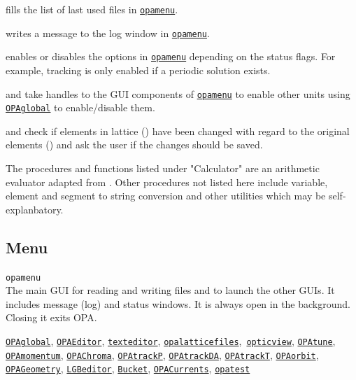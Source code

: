 \documentclass[12pt]{article}
\newcommand\code[1]{{\tt #1}}
\newcommand{\unico}[1]{{\color{burntorange}\code{#1}}}
\newcommand{\opagui}[1]{\colorbox{blue!20}{\code{#1}}}
\newcommand{\oguih}[2]{\subsection{\label{#2}#1}{\Huge\opagui{#2}}\\}
\newcommand{\ogui}[1]{\hyperref[#1]{\opagui{#1}}}
\newcommand{\opauni}[1]{\colorbox{orange!30}{\code{#1}}}
\newcommand{\ouni}[1]{\hyperref[#1]{\opauni{#1}}}
\newcommand{\uses}[1]{\flushleft {\bf Uses:} #1}
\newcommand{\desc}[1]{#1}
\begin{document}
{\unico{FillComboSeg} fills the list of last used files in \ogui{opamenu}.

\unico{OPALog} writes a message to the log window in \ogui{opamenu}.

\unico{MainButtonEnable} enables or disables the options in \ogui{opamenu} depending on the status flags. For example, tracking is only enabled if a periodic solution exists.

\unico{PassMainButtonHandles} and \unico{passErrLogHandle} take handles to the GUI components of \ogui{opamenu} to enable other units using \ouni{OPAglobal} to enable/disable them.

\unico{EllaSave} and \unico{Elcompare} check if elements in lattice (\unico{Ella}) have been changed with regard to the original elements (\unico{Elem}) and ask the user if the changes should be saved.

The procedures and functions listed under "Calculator" are an arithmetic evaluator adapted from \cite{rosetta}. Other procedures not listed here include variable, element and segment to string conversion and other utilities which may be self-explanbatory.
}




\oguih{Menu}{opamenu}

\desc{The main GUI for reading and writing files and to launch the other GUIs. It includes message (log) and status windows. It is always open in the background. Closing it exits OPA.}

\uses{\ouni{OPAglobal}, \ogui{OPAEditor}, \ogui{texteditor}, \ouni{opalatticefiles},\ \ogui{opticview}, \ogui{OPAtune}, 
  \ogui{OPAmomentum}, \ogui{OPAChroma}, \ogui{OPAtrackP},  \ogui{OPAtrackDA}, \ogui{OPAtrackT}, \ogui{OPAorbit},
  \ogui{OPAGeometry}, \ogui{LGBeditor}, \ogui{Bucket}, \ogui{OPACurrents}, \ouni{opatest}}
 
\end{document}
